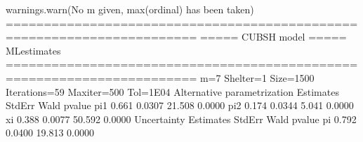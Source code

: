 \documentclass[letterpaper,10pt,english]{sphinxmanual}
\begin{document}
\begin{sphinxVerbatim}[commandchars=\\\{\}]
warnings.warn(\PYGZdq{}No m given, max(ordinal) has been taken\PYGZdq{})
=======================================================================
=====\PYGZgt{}\PYGZgt{}\PYGZgt{} CUBSH model \PYGZlt{}\PYGZlt{}\PYGZlt{}===== ML\PYGZhy{}estimates
=======================================================================
m=7  Shelter=1  Size=1500  Iterations=59  Maxiter=500  Tol=1E\PYGZhy{}04
\PYGZhy{}\PYGZhy{}\PYGZhy{}\PYGZhy{}\PYGZhy{}\PYGZhy{}\PYGZhy{}\PYGZhy{}\PYGZhy{}\PYGZhy{}\PYGZhy{}\PYGZhy{}\PYGZhy{}\PYGZhy{}\PYGZhy{}\PYGZhy{}\PYGZhy{}\PYGZhy{}\PYGZhy{}\PYGZhy{}\PYGZhy{}\PYGZhy{}\PYGZhy{}\PYGZhy{}\PYGZhy{}\PYGZhy{}\PYGZhy{}\PYGZhy{}\PYGZhy{}\PYGZhy{}\PYGZhy{}\PYGZhy{}\PYGZhy{}\PYGZhy{}\PYGZhy{}\PYGZhy{}\PYGZhy{}\PYGZhy{}\PYGZhy{}\PYGZhy{}\PYGZhy{}\PYGZhy{}\PYGZhy{}\PYGZhy{}\PYGZhy{}\PYGZhy{}\PYGZhy{}\PYGZhy{}\PYGZhy{}\PYGZhy{}\PYGZhy{}\PYGZhy{}\PYGZhy{}\PYGZhy{}\PYGZhy{}\PYGZhy{}\PYGZhy{}\PYGZhy{}\PYGZhy{}\PYGZhy{}\PYGZhy{}\PYGZhy{}\PYGZhy{}\PYGZhy{}\PYGZhy{}\PYGZhy{}\PYGZhy{}\PYGZhy{}\PYGZhy{}\PYGZhy{}\PYGZhy{}
Alternative parametrization
       Estimates  StdErr    Wald  p\PYGZhy{}value
pi1        0.661  0.0307  21.508   0.0000
pi2        0.174  0.0344   5.041   0.0000
xi         0.388  0.0077  50.592   0.0000
\PYGZhy{}\PYGZhy{}\PYGZhy{}\PYGZhy{}\PYGZhy{}\PYGZhy{}\PYGZhy{}\PYGZhy{}\PYGZhy{}\PYGZhy{}\PYGZhy{}\PYGZhy{}\PYGZhy{}\PYGZhy{}\PYGZhy{}\PYGZhy{}\PYGZhy{}\PYGZhy{}\PYGZhy{}\PYGZhy{}\PYGZhy{}\PYGZhy{}\PYGZhy{}\PYGZhy{}\PYGZhy{}\PYGZhy{}\PYGZhy{}\PYGZhy{}\PYGZhy{}\PYGZhy{}\PYGZhy{}\PYGZhy{}\PYGZhy{}\PYGZhy{}\PYGZhy{}\PYGZhy{}\PYGZhy{}\PYGZhy{}\PYGZhy{}\PYGZhy{}\PYGZhy{}\PYGZhy{}\PYGZhy{}\PYGZhy{}\PYGZhy{}\PYGZhy{}\PYGZhy{}\PYGZhy{}\PYGZhy{}\PYGZhy{}\PYGZhy{}\PYGZhy{}\PYGZhy{}\PYGZhy{}\PYGZhy{}\PYGZhy{}\PYGZhy{}\PYGZhy{}\PYGZhy{}\PYGZhy{}\PYGZhy{}\PYGZhy{}\PYGZhy{}\PYGZhy{}\PYGZhy{}\PYGZhy{}\PYGZhy{}\PYGZhy{}\PYGZhy{}\PYGZhy{}\PYGZhy{}
Uncertainty
       Estimates  StdErr    Wald  p\PYGZhy{}value
pi         0.792  0.0400  19.813   0.0000
\PYGZhy{}\PYGZhy{}\PYGZhy{}\PYGZhy{}\PYGZhy{}\PYGZhy{}\PYGZhy{}\PYGZhy{}\PYGZhy{}\PYGZhy{}\PYGZhy{}\PYGZhy{}\PYGZhy{}\PYGZhy{}\PYGZhy{}\PYGZhy{}\PYGZhy{}\PYGZhy{}\PYGZhy{}\PYGZhy{}\PYGZhy{}\PYGZhy{}\PYGZhy{}\PYGZhy{}\PYGZhy{}\PYGZhy{}\PYGZhy{}\PYGZhy{}\PYGZhy{}\PYGZhy{}\PYGZhy{}\PYGZhy{}\PYGZhy{}\PYGZhy{}\PYGZhy{}\PYGZhy{}\PYGZhy{}\PYGZhy{}\PYGZhy{}\PYGZhy{}\PYGZhy{}\PYGZhy{}\PYGZhy{}\PYGZhy{}\PYGZhy{}\PYGZhy{}\PYGZhy{}\PYGZhy{}\PYGZhy{}\PYGZhy{}\PYGZhy{}\PYGZhy{}\PYGZhy{}\PYGZhy{}\PYGZhy{}\PYGZhy{}\PYGZhy{}\PYGZhy{}\PYGZhy{}\PYGZhy{}\PYGZhy{}\PYGZhy{}\PYGZhy{}\PYGZhy{}\PYGZhy{}\PYGZhy{}\PYGZhy{}\PYGZhy{}\PYGZhy{}\PYGZhy{}\PYGZhy{}

\end{sphinxVerbatim}
\end{document}
